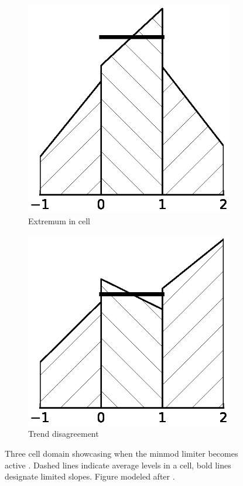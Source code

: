 \begin{figure}
\begin{subfigure}{0.27\textwidth}
    \includegraphics[width=\textwidth]{figures/minmod-b}
    \caption{Extremum in cell}
    \label{fig:minmod-extremum}
  \end{subfigure}
  \hfill
  \begin{subfigure}{0.27\textwidth}
    \centering
    \includegraphics[width=\textwidth]{figures/minmod-c}
    \caption{Trend disagreement}
    \label{fig:minmod-trend}
  \end{subfigure}
  \caption{Three cell domain showcasing when the minmod limiter becomes active . Dashed lines indicate average levels in a cell, bold lines designate limited slopes. Figure modeled after \cite[Figure 3]{VanLeer1979}.}
  \label{fig:minmod}
\end{figure}

